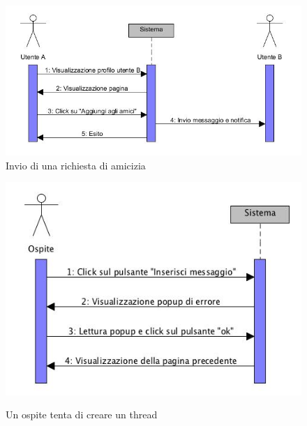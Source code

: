 \documentclass[a4paper,12pt]{article}
\begin{document}
\begin{figure}
\centering
\includegraphics[scale=0.70]{sDiagrams/richiestaAmicizia.jpg} \\
\caption{\label{richiestaAmicizia} Invio di una richiesta di amicizia}
\vspace{2cm}
\includegraphics[scale=0.70]{sDiagrams/tentativoCreazioneThread.jpg} \\
\caption{\label{tentativoCreazioneThread} Un ospite tenta di creare un thread}
\end{figure}
\end{document}
